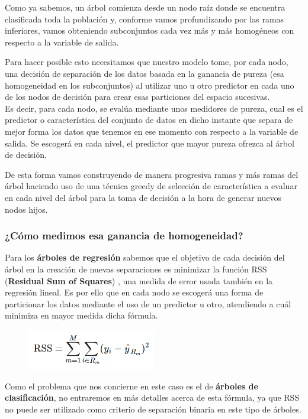 Como ya sabemos, un árbol comienza desde un nodo raíz donde se encuentra clasificada toda la población y, conforme vamos profundizando por las ramas inferiores, vamos obteniendo subconjuntos cada vez más y más homogéneos con respecto a la variable de salida.

Para hacer posible esto necesitamos que nuestro modelo tome, por cada nodo, una decisión de separación de los datos basada en la ganancia de pureza (esa homogeneidad en los subconjuntos) al utilizar uno u otro predictor en cada uno de los nodos de decisión para crear esas particiones del espacio sucesivas.\\
Es decir, para cada nodo, se evalúa mediante unos medidores de pureza, cual es el predictor o característica del conjunto de datos en dicho instante que separa de mejor forma los datos que tenemos en ese momento con respecto a la variable de salida. Se escogerá en cada nivel, el predictor que mayor pureza ofrezca al árbol de decisión.

De esta forma vamos construyendo de manera progresiva ramas y más ramas del árbol haciendo uso de una técnica greedy de selección de característica a evaluar en cada nivel del árbol para la toma de decisión a la hora de generar nuevos nodos hijos.

\subsubsection{¿Cómo medimos esa ganancia de homogeneidad?}

Para los\textbf{ árboles de regresión} sabemos que el objetivo de cada decisión del árbol en la creación de nuevas separaciones es minimizar la función RSS (\textbf{Residual Sum of Squares}) \cite{ref6}, una medida de error usada también en la regresión lineal. Es por ello que en cada nodo se escogerá una forma de particionar los datos mediante el uso de un predictor u otro, atendiendo a cuál minimiza en mayor medida dicha fórmula.

\begin{figure}[H]
	\centering
	\includegraphics[width=0.5\textwidth]{imagenes/rss} 
\end{figure}

Como el problema que nos concierne en este caso es el de \textbf{árboles de clasificación}, no entraremos en más detalles acerca de esta fórmula, ya que RSS no puede ser utilizado como criterio de separación binaria en este tipo de árboles.

